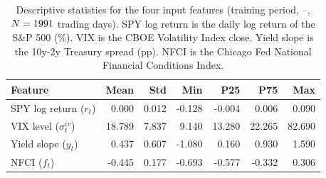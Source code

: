 \begin{table}[htbp]
\centering
\caption{Descriptive statistics for the four input features (training period, \nTrainStart{}--\nTrainEnd{}, $N=1991{}$ trading days). SPY log return is the daily log return of the S\&P 500 (\%). VIX is the CBOE Volatility Index close. Yield slope is the 10y-2y Treasury spread (pp). NFCI is the Chicago Fed National Financial Conditions Index.}
\label{tab:desc_stats}
\begin{tabular}{lrrrrrr}
\toprule
Feature & Mean & Std & Min & P25 & P75 & Max \\
\midrule
SPY log return ($r_t$) & 0.000 & 0.012 & -0.128 & -0.004 & 0.006 & 0.090 \\
VIX level ($\sigma^{iv}_t$) & 18.789 & 7.837 & 9.140 & 13.280 & 22.265 & 82.690 \\
Yield slope ($y_t$) & 0.437 & 0.607 & -1.080 & 0.160 & 0.930 & 1.590 \\
NFCI ($f_t$) & -0.445 & 0.177 & -0.693 & -0.577 & -0.332 & 0.306 \\
\bottomrule
\end{tabular}
\end{table}
